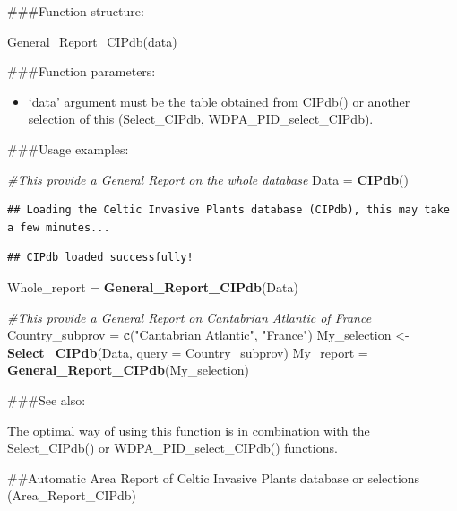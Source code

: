 \documentclass[
]{article}
\newenvironment{Shaded}{\begin{snugshade}}{\end{snugshade}}
\newcommand{\AttributeTok}[1]{\textcolor[rgb]{0.13,0.29,0.53}{#1}}
\newcommand{\CommentTok}[1]{\textcolor[rgb]{0.56,0.35,0.01}{\textit{#1}}}
\newcommand{\FunctionTok}[1]{\textcolor[rgb]{0.13,0.29,0.53}{\textbf{#1}}}
\newcommand{\NormalTok}[1]{#1}
\newcommand{\OtherTok}[1]{\textcolor[rgb]{0.56,0.35,0.01}{#1}}
\newcommand{\StringTok}[1]{\textcolor[rgb]{0.31,0.60,0.02}{#1}}
\providecommand{\tightlist}{%
  \setlength{\itemsep}{0pt}\setlength{\parskip}{0pt}}
\begin{document}
\#\#\#Function structure:

General\_Report\_CIPdb(data)

\#\#\#Function parameters:

\begin{itemize}
\tightlist
\item
  `data' argument must be the table obtained from CIPdb() or another
  selection of this (Select\_CIPdb, WDPA\_PID\_select\_CIPdb).
\end{itemize}

\#\#\#Usage examples:

\begin{Shaded}
\begin{Highlighting}[]
\CommentTok{\#This provide a General Report on the whole database}
\NormalTok{Data }\OtherTok{=} \FunctionTok{CIPdb}\NormalTok{()}
\end{Highlighting}
\end{Shaded}

\begin{verbatim}
## Loading the Celtic Invasive Plants database (CIPdb), this may take a few minutes...
\end{verbatim}

\begin{verbatim}
## CIPdb loaded successfully!
\end{verbatim}

\begin{Shaded}
\begin{Highlighting}[]
\NormalTok{Whole\_report }\OtherTok{=} \FunctionTok{General\_Report\_CIPdb}\NormalTok{(Data)}

\CommentTok{\#This provide a General Report on Cantabrian Atlantic of France}
\NormalTok{Country\_subprov }\OtherTok{=} \FunctionTok{c}\NormalTok{(}\StringTok{"Cantabrian Atlantic"}\NormalTok{, }\StringTok{"France"}\NormalTok{)}
\NormalTok{My\_selection }\OtherTok{\textless{}{-}} \FunctionTok{Select\_CIPdb}\NormalTok{(Data, }\AttributeTok{query =}\NormalTok{  Country\_subprov)}
\NormalTok{My\_report }\OtherTok{=} \FunctionTok{General\_Report\_CIPdb}\NormalTok{(My\_selection)}
\end{Highlighting}
\end{Shaded}

\#\#\#See also:

The optimal way of using this function is in combination with the
Select\_CIPdb() or WDPA\_PID\_select\_CIPdb() functions.

\#\#Automatic Area Report of Celtic Invasive Plants database or
selections (Area\_Report\_CIPdb)
\end{document}
